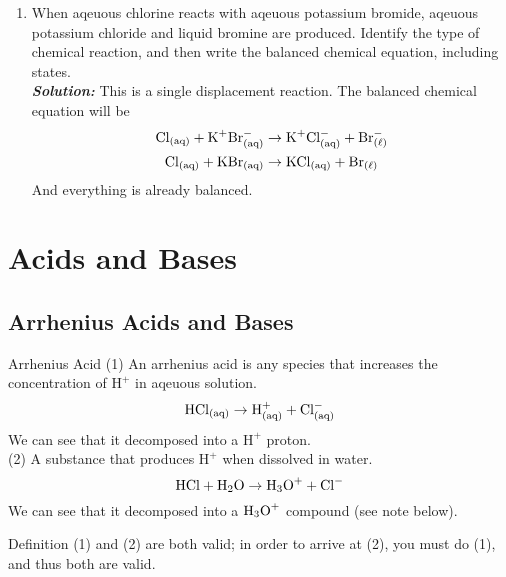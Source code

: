 \documentclass[12pt]{report}
\begin{document}
\begin{enumerate}
        \item{When aqeuous chlorine reacts with aqeuous potassium bromide, aqeuous potassium chloride and liquid bromine are produced. Identify the type of chemical reaction, and then write the balanced chemical equation, including states.}\\

            \textit{\textbf{Solution:}} This is a single displacement reaction. The balanced chemical equation will be 
            \begin{align*}
                \ce{Cl_{(aq)}}+ \text{K}^{+} \text{Br}^{-}_{\text{(aq)}}&\to \text{K}^{+} \text{Cl}^{-}_{\text{(aq)}}+ \ce{Br^{-}_{( \ell )}}\\
                \ce{Cl_{(aq)}}+ \ce{KBr_{(aq)}}&\to \ce{KCl_{(aq)}}+ \ce{Br_{( \ell )}}\\
            \end{align*}
            And everything is already balanced. 
\end{enumerate}

\newpage
\section{Acids and Bases}
\subsection{Arrhenius Acids and Bases}

\begin{definition}{Arrhenius Acid}
    (1) An arrhenius acid is any species that increases the concentration of $\text{H}^{+}$ in aqeuous solution.\\
    \[
        \ce{HCl_{(aq)}}\to \text{H}^{+}_{\text{(aq)}}+ \text{Cl}^{-}_{\text{(aq)}}
    \]
    We can see that it decomposed into a $\text{H}^{+}$ proton.\\

    (2) A substance that produces $\text{H}^{+}$ when dissolved in water. 
    \[
    \ce{HCl}+ \ce{H2O}\to \ce{H3} \text{O}^{+}+ \ce{Cl}^{-}
    \]
    We can see that it decomposed into a $\ce{H3} \text{O}^{+}$ compound (see note below). 

\end{definition}

\begin{remark}{ } 
    Definition (1) and (2) are both valid; in order to arrive at (2), you must do (1), and thus both are valid. 
\end{remark}
\end{document}
